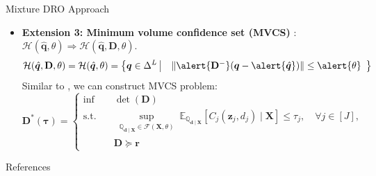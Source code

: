 \documentclass{beamer}
\newcommand{\mb}[1]{{\mathbf{#1}}}
\newcommand{\txrd}[1]{{\textcolor{sintefred}{\textbf{#1}}}}
\newcommand{\bbq}{\mathbb{Q}}
\begin{document}

\begin{frame}{Mixture DRO Approach}

\begin{itemize}
    \item \txrd{Extension 3: Minimum volume confidence set (MVCS)} \citep{lou2024estimation}:  $\mathcal{H}(\hat{\bm q}, \theta) \Rightarrow  \mathcal{H}(\hat{\bm q}, \mb D, \theta)$.
    \[
    \mathcal{H}(\hat{\bm q}, \mb D, \theta) =
    \mathcal{H}(\hat{\bm q}, \theta) = \left \{ \bm q \in \Delta^L \
    \begin{array}{|ll} \
        \ \|\alert{\mb D^-} (\bm q - \alert{\hat{\bm q}}) \| \leq \alert{\theta}
    \end{array}
    \right \} 
    \]
    Similar to \citet{lou2024estimation}, we can construct MVCS problem:
        \[
    \mb D^*(\bm\tau)
    =
    \left\{
    \begin{aligned}
    \inf \quad & {\det} (\mb D) \\
    \text{s.t.} \quad
    & \sup_{\substack{
    \bbq_{\bm d \mid \mb X} \in \mathcal{F}(\mb X, \theta)
    }}
    \mathbb{E}_{\bbq_{\bm d \mid \mb X}}
    \!\left[
        C_j(\bm z_j, d_j) \mid \mb X
    \right]
    \leq \tau_j,
    \quad \forall j \in [J], \\
    & \mathbf{D}\succeq \boldsymbol{r}
    \end{aligned}
    \right.
    \]
    

\end{itemize}

\end{frame}



\begin{frame}[allowframebreaks]{References}
\tiny


\end{frame}

\backmatter
\end{document}
